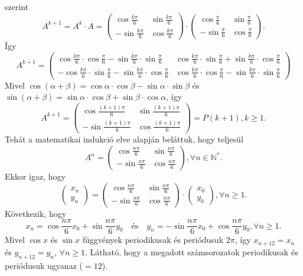 \begin{solution}
szerint 
\[
A^{k+1}=A^{k}\cdot A=\begin{pmatrix}\cos\frac{k\pi}{6} & \sin\frac{k\pi}{6}\\
-\sin\frac{k\pi}{6} & \cos\frac{k\pi}{6}
\end{pmatrix}\cdot\begin{pmatrix}\cos\frac{\pi}{6} & \sin\frac{\pi}{6}\\
-\sin\frac{\pi}{6} & \cos\frac{\pi}{6}
\end{pmatrix}.
\]
Így 
\[
A^{k+1}=\begin{pmatrix}\cos\frac{k\pi}{6}\cdot\cos\frac{\pi}{6}-\sin\frac{k\pi}{6}\cdot\sin\frac{\pi}{6} & \cos\frac{k\pi}{6}\cdot\sin\frac{\pi}{6}+\sin\frac{k\pi}{6}\cdot\cos\frac{\pi}{6}\\
-\cos\frac{k\pi}{6}\cdot\sin\frac{\pi}{6}-\sin\frac{k\pi}{6}\cdot\cos\frac{\pi}{6} & \cos\frac{k\pi}{6}\cdot\cos\frac{\pi}{6}-\sin\frac{k\pi}{6}\cdot\sin\frac{\pi}{6}
\end{pmatrix}
\]
Mivel $\cos(\alpha+\beta)=\cos\alpha\cdot\cos\beta-\sin\alpha\cdot\sin\beta$
és $\sin(\alpha+\beta)=\sin\alpha\cdot\cos\beta+\sin\beta\cdot\cos\alpha$,
így 
\[
A^{k+1}=\begin{pmatrix}\cos\frac{(k+1)\pi}{6} & \sin\frac{(k+1)\pi}{6}\\
-\sin\frac{(k+1)\pi}{6} & \cos\frac{(k+1)\pi}{6}
\end{pmatrix}=P(k+1),k\geq1.
\]
Tehát a matematikai indukció elve alapján beláttuk, hogy teljesül
\[
A^{n}=\begin{pmatrix}\cos\frac{n\pi}{6} & \sin\frac{n\pi}{6}\\
-\sin\frac{n\pi}{6} & \cos\frac{n\pi}{6}
\end{pmatrix},\forall n\in\mathbb{N^{*}}.
\]
Ekkor igaz, hogy 
\[
\begin{pmatrix}x_{n}\\
y_{n}
\end{pmatrix}=\begin{pmatrix}\cos\frac{n\pi}{6} & \sin\frac{n\pi}{6}\\
-\sin\frac{n\pi}{6} & \cos\frac{n\pi}{6}
\end{pmatrix}\cdot\begin{pmatrix}x_{0}\\
y_{0}
\end{pmatrix},\forall n\geq1.
\]
Következik, hogy 
\[
x_{n}=\cos\frac{n\pi}{6}x_{0}+\sin\frac{n\pi}{6}y_{0}\quad\text{és}\quad y_{n}=-\sin\frac{n\pi}{6}x_{0}+\cos\frac{n\pi}{6}y_{0},\forall n\geq1.
\]
Mivel $\cos x$ és $\sin x$ függvények periodikusak és periódusuk
$2\pi$, így $x_{n+12}=x_{n}$ és $y_{n+12}=y_{n}$, $\forall n\geq1$.
Látható, hogy a megadott számsorozatok periodikusak és periódusuk
ugyanaz ($=12$).
\end{solution}
